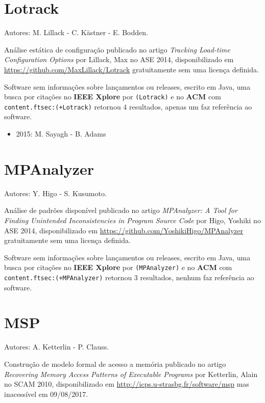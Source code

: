 \section{Lotrack}

Autores:
M. Lillack - C. K\"{a}stner - E. Bodden.

Análise estática de configuração
publicado no artigo {\it Tracking Load-time Configuration Options}
por Lillack, Max
no ASE 2014,
disponibilizado em \url{https://github.com/MaxLillack/Lotrack}
gratuitamente
sem uma licença definida.

Software sem informações sobre lançamentos ou releases,
escrito em Java,
uma busca por citações no {\bf IEEE Xplore} por
\texttt{(Lotrack)}
e no {\bf ACM} com
\texttt{content.ftsec:(+Lotrack)}
retornou
4 resultados,
apenas um faz referência ao software.

\begin{itemize}
\item 2015: M. Sayagh - B. Adams
\end{itemize}

\section{MPAnalyzer}

Autores:
Y. Higo - S. Kusumoto.

Análise de padrões disponível
publicado no artigo {\it MPAnalyzer: A Tool for Finding Unintended Inconsistencies in Program Source Code}
por Higo, Yoshiki
no ASE 2014,
disponibilizado em \url{https://github.com/YoshikiHigo/MPAnalyzer}
gratuitamente
sem uma licença definida.

Software sem informações sobre lançamentos ou releases,
escrito em Java,
uma busca por citações no {\bf IEEE Xplore} por
\texttt{(MPAnalyzer)}
e no {\bf ACM} com
\texttt{content.ftsec:(+MPAnalyzer)}
retornou
3 resultados,
nenhum faz referência ao software.


\section{MSP}

Autores:
A. Ketterlin - P. Clauss.

Construção de modelo formal de acesso a memória
publicado no artigo {\it Recovering Memory Access Patterns of Executable Programs}
por Ketterlin, Alain
no SCAM 2010,
disponibilizado em \url{http://icps.u-strasbg.fr/software/msp}
mas inacessível em 09/08/2017.

